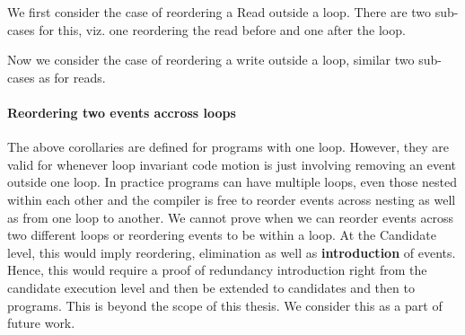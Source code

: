             We first consider the case of reordering a Read outside a loop. There are two sub-cases for this, viz. one reordering the read before and one after the loop. 
                        

            Now we consider the case of reordering a write outside a loop, similar two sub-cases as for reads.           
               

            \paragraph{Reordering two events accross loops} 
            
            The above corollaries are defined for programs with one loop. 
            However, they are valid for whenever loop invariant code motion is just involving removing an event outside one loop. 
            In practice programs can have multiple loops, even those nested within each other and the compiler is free to reorder events across nesting as well as from one loop to another.
            We cannot prove when we can reorder events across two different loops or reordering events to be within a loop.
            At the Candidate level, this would imply reordering, elimination as well as \textbf{introduction} of events. 
            Hence, this would require a proof of redundancy introduction right from the candidate execution level and then be extended to candidates and then to programs. 
            This is beyond the scope of this thesis. We consider this as a part of future work. 